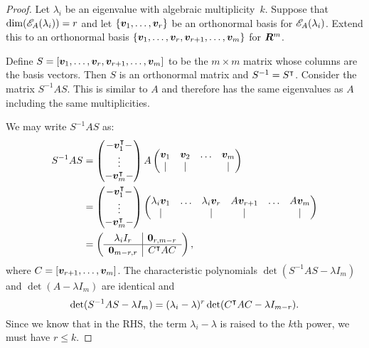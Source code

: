 \begin{proof}
Let $\lambda_i$ be an eigenvalue with algebraic multiplicity~$k$.  Suppose that
$\dim(\mathscr{E}_{A}(\lambda_i)) = r$ and let $\{\boldsymbol{v}_1, \ldots, \boldsymbol{v}_r\}$ be an
orthonormal basis for $\mathscr{E}_{A}(\lambda_i)$.  Extend this to an
orthonormal basis $\{\boldsymbol{v}_1, \ldots, \boldsymbol{v}_r, \boldsymbol{v}_{r + 1}, \ldots, \boldsymbol{v}_m\}$
for $\bm{R}^m$.

Define $S = [\boldsymbol{v}_1, \ldots, \boldsymbol{v}_r, \boldsymbol{v}_{r + 1}, \ldots, \boldsymbol{v}_m]$
to be the $m \times m$ matrix whose columns are the basis vectors.
Then $S$ is an orthonormal matrix and $S^{-1} = S^{\intercal}$. Consider the
matrix $S^{-1} A S$. This is similar to $A$ and therefore has the
same eigenvalues as $A$ including the same multiplicities.

We may write $S^{-1} A S$ as:
\begin{align*}
    S^{-1} A S & = \begin{pmatrix}
                        -\boldsymbol{v}_1^{\intercal}- \\
                         \vdots \\
                        -\boldsymbol{v}_m^{\intercal}-
                   \end{pmatrix}
                   A
                   \begin{pmatrix}
                    \boldsymbol{v}_1 & \boldsymbol{v}_2 & \ldots & \boldsymbol{v}_m \\
                        |      &    |       &        &    |
                   \end{pmatrix} \\
              & = \begin{pmatrix}
                        -\boldsymbol{v}_1^{\intercal}- \\
                         \vdots \\
                        -\boldsymbol{v}_m^{\intercal}-
                   \end{pmatrix}
                   \begin{pmatrix}
                    \lambda_i \boldsymbol{v}_1 & \ldots & \lambda_i \boldsymbol{v}_r & A \boldsymbol{v}_{r + 1} & \ldots & A \boldsymbol{v}_m \\
                            |          &        &         |          &          |         &        &     |
                   \end{pmatrix} \\
             & = \left ( \begin{array}{c|c}
                    \lambda_i I_r         & \boldsymbol{0}_{r, m - r} \\ \hline
                    \boldsymbol{0}_{m - r, r} & C^{\intercal} A C
                 \end{array} \right ),
\end{align*}
where $C = [\boldsymbol{v}_{r + 1}, \ldots, \boldsymbol{v}_m]$. The characteristic polynomials
$\det (S^{-1} A S - \lambda I_m)$ and $\det (A - \lambda I_m)$ are identical
and
\[
   \det (S^{-1} A S - \lambda I_m) = (\lambda_i - \lambda)^r \det (C^{\intercal} A C - \lambda I_{m - r}).
\]
Since we know that in the RHS, the term $\lambda_i - \lambda$ is raised to the $k$th power,
we must have $r \leq k$.
\end{proof}

